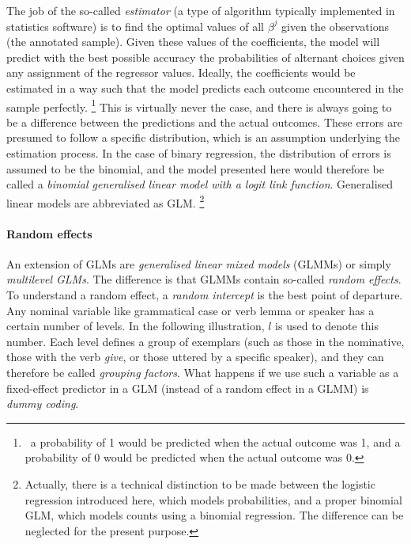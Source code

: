 The job of the so-called \textit{estimator} (a type of algorithm typically implemented in statistics software) is to find the optimal values of all $\beta^j$ given the observations (the annotated sample).
Given these values of the coefficients, the model will predict with the best possible accuracy the probabilities of alternant choices given any assignment of the regressor values.
Ideally, the coefficients would be estimated in a way such that the model predicts each outcome encountered in the sample perfectly.%
\footnote{\Ie\ a probability of 1 would be predicted when the actual outcome was 1, and a probability of 0 would be predicted when the actual outcome was 0.}
This is virtually never the case, and there is always going to be a difference between the predictions and the actual outcomes.
These errors are presumed to follow a specific distribution, which is an assumption underlying the estimation process.
In the case of binary regression, the distribution of errors is assumed to be the binomial, and the model presented here would therefore be called a \textit{binomial generalised linear model with a logit link function}.
Generalised linear models are abbreviated as GLM.%
\footnote{Actually, there is a technical distinction to be made between the logistic regression introduced here, which models probabilities, and a proper binomial GLM, which models counts using a binomial regression.
The difference can be neglected for the present purpose.}

\paragraph{Random effects}

An extension of GLMs are \textit{generalised linear mixed models} (GLMMs) or simply \textit{multilevel GLMs}.
The difference is that GLMMs contain so-called \textit{random effects}.
To understand a random effect, a \textit{random intercept} is the best point of departure.
Any nominal variable like grammatical case or verb lemma or speaker has a certain number of levels.
In the following illustration, $l$ is used to denote this number.
Each level defines a group of exemplars (such as those in the nominative, those with the verb \textit{give}, or those uttered by a specific speaker), and they can therefore be called \textit{grouping factors}.
What happens if we use such a variable as a fixed-effect predictor in a GLM (instead of a random effect in a GLMM) is \textit{dummy coding}.

